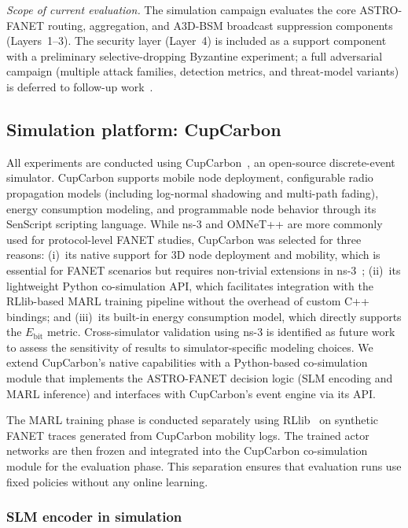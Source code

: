 \documentclass[5p,times]{elsarticle}
\begin{document}
\textit{Scope of current evaluation.} The simulation campaign evaluates the core ASTRO-FANET routing, aggregation, and A3D-BSM broadcast suppression components (Layers~1--3). The security layer (Layer~4) is included as a support component with a preliminary selective-dropping Byzantine experiment; a full adversarial campaign (multiple attack families, detection metrics, and threat-model variants) is deferred to follow-up work~\cite{maxa2017secure_fanet,singh2023survey_fanet_security}.

\subsection{Simulation platform: CupCarbon}

All experiments are conducted using CupCarbon~\cite{mehdi2014cupcarbon}, an open-source discrete-event simulator. CupCarbon supports mobile node deployment, configurable radio propagation models (including log-normal shadowing and multi-path fading), energy consumption modeling, and programmable node behavior through its SenScript scripting language. While ns-3 and OMNeT++ are more commonly used for protocol-level FANET studies, CupCarbon was selected for three reasons: (i)~its native support for 3D node deployment and mobility, which is essential for FANET scenarios but requires non-trivial extensions in ns-3~\cite{gawlowicz2019ns3gym}; (ii)~its lightweight Python co-simulation API, which facilitates integration with the RLlib-based MARL training pipeline without the overhead of custom C++ bindings; and (iii)~its built-in energy consumption model, which directly supports the $E_{\mathrm{bit}}$ metric. Cross-simulator validation using ns-3 is identified as future work to assess the sensitivity of results to simulator-specific modeling choices. We extend CupCarbon's native capabilities with a Python-based co-simulation module that implements the ASTRO-FANET decision logic (SLM encoding and MARL inference) and interfaces with CupCarbon's event engine via its API.

The MARL training phase is conducted separately using RLlib~\cite{liang2018rllib} on synthetic FANET traces generated from CupCarbon mobility logs. The trained actor networks are then frozen and integrated into the CupCarbon co-simulation module for the evaluation phase. This separation ensures that evaluation runs use fixed policies without any online learning.

\subsubsection{SLM encoder in simulation}
\label{subsubsec:slm_emulation}
\end{document}
